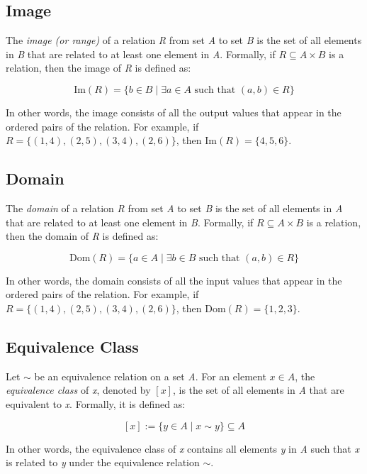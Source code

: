 \subsection{Image}

The \emph{image (or range)} of a relation \emph{R} from set \emph{A} to set \emph{B} is the set 
of all elements in \emph{B} that are related to at least one element in \emph{A}. Formally, if 
\(R \subseteq A \times B\) is a relation, then the image of \emph{R} is defined as:

\[
	\text{Im}(R) = \{b \in B \mid \exists a \in A \text{ such that } (a,b) \in R\}
\]

In other words, the image consists of all the output values that appear in the ordered pairs of the 
relation. For example, if \(R = \{(1,4), (2,5), (3,4), (2,6)\}\), then \(\text{Im}(R) = \{4, 5, 6\}\).

\subsection{Domain}

The \emph{domain} of a relation \emph{R} from set \emph{A} to set \emph{B} is the set of all elements in 
\emph{A} that are related to at least one element in \emph{B}. Formally, if \(R \subseteq A \times B\) 
is a relation, then the domain of \emph{R} is defined as:

\[
	\text{Dom}(R) = \{a \in A \mid \exists b \in B \text{ such that } (a,b) \in R\}
\]

In other words, the domain consists of all the input values that appear in the ordered pairs of the 
relation. For example, if \(R = \{(1,4), (2,5), (3,4), (2,6)\}\), then \(\text{Dom}(R) = \{1, 2, 3\}\).

\subsection{Equivalence Class}

Let \(\sim\) be an equivalence relation on a set \emph{A}. For an element \(x \in A\), the 
\emph{equivalence class} of \emph{x}, denoted by \([x]\), is the set of all elements in \emph{A} that are 
equivalent to \emph{x}. Formally, it is defined as:

\[
	[x] := \{y \in A \mid x \sim y\} \subseteq A
\]

In other words, the equivalence class of \emph{x} contains all elements \emph{y} in \emph{A} such that 
\emph{x} is related to \emph{y} under the equivalence relation \(\sim\).

